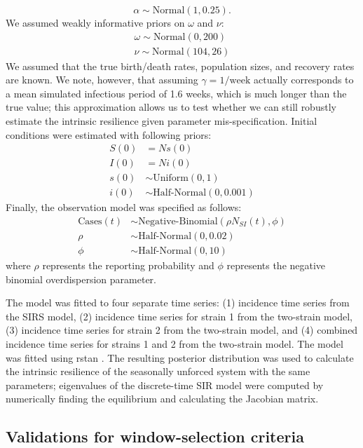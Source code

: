 \documentclass[12pt]{article}
\begin{document}
\begin{equation}
\alpha \sim \mathrm{Normal}(1, 0.25).
\end{equation}
We assumed weakly informative priors on $\omega$ and $\nu$:
\begin{align}
\omega \sim \mathrm{Normal}(0, 200)\\
\nu \sim \mathrm{Normal}(104, 26)
\end{align}
We assumed that the true birth/death rates, population sizes, and recovery rates are known.
We note, however, that assuming $\gamma=1/\mathrm{week}$ actually corresponds to a mean simulated infectious period of 1.6 weeks, which is much longer than the true value; this approximation allows us to test whether we can still robustly estimate the intrinsic resilience given parameter mis-specification.
Initial conditions were estimated with following priors:
\begin{align}
S(0) &= N s(0)\\
I(0) &= N i(0)\\
s(0) &\sim \textrm{Uniform}(0, 1)\\
i(0) &\sim \textrm{Half-Normal}(0, 0.001)
\end{align}
Finally, the observation model was specified as follows:
\begin{align}
\textrm{Cases}(t) &\sim \textrm{Negative-Binomial}(\rho N_{SI}(t), \phi)\\
\rho &\sim \textrm{Half-Normal}(0, 0.02)\\
\phi &\sim \textrm{Half-Normal}(0, 10)
\end{align}
where $\rho$ represents the reporting probability and $\phi$ represents the negative binomial overdispersion parameter.

The model was fitted to four separate time series: (1) incidence time series from the SIRS model, (2) incidence time series for strain 1 from the two-strain model, (3) incidence time series for strain 2 from the two-strain model, and (4) combined incidence time series for strains 1 and 2 from the two-strain model.
The model was fitted using rstan \citep{carpenter2017stan,rstan}.
The resulting posterior distribution was used to calculate the intrinsic resilience of the seasonally unforced system with the same parameters;
eigenvalues of the discrete-time SIR model were computed by numerically finding the equilibrium and calculating the Jacobian matrix.

\subsection*{Validations for window-selection criteria}
\end{document}
